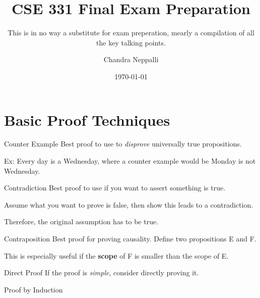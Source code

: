 \documentclass{beamer}
\title{CSE 331 Final Exam Preparation}
\subtitle{This is in no way a substitute for exam preperation, mearly a compilation of all the key talking points.}
\author{Chandra Neppalli}
\date{\today}
\begin{document}
    \maketitle
    \section{Basic Proof Techniques}
    \begin{frame}{Counter Example}  
        Best proof to use to \textit{disprove} universally true propositions.
        \bigskip

        Ex: Every day is a Wednesday, where a counter example would be Monday is not Wednesday.
    \end{frame}
    \begin{frame}{Contradiction}
        Best proof to use if you want to assert something is true.
        \bigskip

        Assume what you want to prove is false, then show this leads to a contradiction.
        \bigskip

        Therefore, the original assumption has to be true.            
    \end{frame}
    \begin{frame}{Contraposition}
        Best proof for proving causality. Define two propositions E and F.
        \bigskip

        \bigskip

        This is especially useful if the \textbf{scope} of F is smaller than the scope of E.
    \end{frame}
    \begin{frame}{Direct Proof}
    \label{frame:directproof}
        If the proof is \textit{simple}, consider directly proving it.
        \bigskip

    \end{frame}
    \begin{frame}{Proof by Induction}
        \bigskip

    \end{frame}
\end{document}
